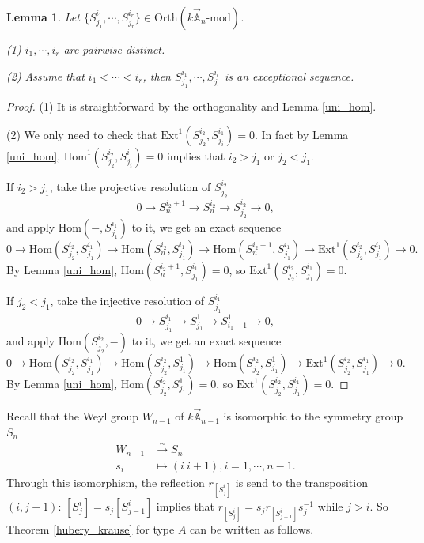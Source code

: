 \documentclass[a4paper, 11pt, reqno]{amsart}
\numberwithin{equation}{section}
\newtheorem{lem}[thm]{Lemma}
\theoremstyle{remark}
\theoremstyle{definition}
\begin{document}
\begin{lem}
   Let $\{S^{i_1}_{j_1}, \cdots, S^{i_r}_{j_r} \} \in \mathrm{Orth}(k \vec{\mathbb A}_{n} \text{-} \mathrm{mod})$.

   (1) $i_1, \cdots, i_r$ are pairwise distinct.

   (2) Assume that $i_1 < \cdots <i_r$, then $S^{i_1}_{j_1}, \cdots, S^{i_r}_{j_r}$ is an exceptional sequence.
\end{lem}
\begin{proof}
   (1) It is straightforward by the orthogonality and Lemma \ref{uni_hom}.

   (2) We only need to check that $\mathrm{Ext}^1(S^{i_2}_{j_2},S^{i_1}_{j_i})=0$. In fact by Lemma \ref{uni_hom}, $\mathrm{Hom}^1(S^{i_2}_{j_2},S^{i_1}_{j_i})=0$ implies that $i_2>j_1$ or $j_2<j_1$. 
   
   If $i_2>j_1$, take the projective resolution of $S^{i_2}_{j_2}$
   \[0 \to S^{i_2+1}_{n} \to S^{i_2}_n \to S^{i_2}_{j_2} \to 0,\]
   and apply $\mathrm{Hom}(-,S^{i_1}_{j_1})$ to it, we get an exact sequence
   \[0 \to \mathrm{Hom}(S^{i_2}_{j_2},S^{i_1}_{j_1}) \to \mathrm{Hom}(S^{i_2}_{n},S^{i_1}_{j_1}) \to \mathrm{Hom}(S^{i_2+1}_{n},S^{i_1}_{j_1}) \to \mathrm{Ext}^1(S^{i_2}_{j_2},S^{i_1}_{j_1}) \to 0.\]
   By Lemma \ref{uni_hom}, $\mathrm{Hom}(S^{i_2+1}_{n},S^{i_1}_{j_1})=0$, so $\mathrm{Ext}^1(S^{i_2}_{j_2},S^{i_1}_{j_1}) =0$.

   If $j_2<j_1$, take the injective resolution of $S^{i_1}_{j_1}$
   \[0 \to S^{i_1}_{j_1} \to S^{1}_{j_1} \to S^{1}_{i_1-1} \to 0,\]
   and apply $\mathrm{Hom}(S^{i_2}_{j_2},-)$ to it, we get an exact sequence
   \[0 \to \mathrm{Hom}(S^{i_2}_{j_2},S^{i_1}_{j_1}) \to \mathrm{Hom}(S^{i_2}_{j_2},S^{1}_{j_1}) \to \mathrm{Hom}(S^{i_2}_{j_2},S^{1}_{j_1}) \to \mathrm{Ext}^1(S^{i_2}_{j_2},S^{i_1}_{j_1}) \to 0. \]
   By Lemma \ref{uni_hom}, $\mathrm{Hom}(S^{i_2}_{j_2},S^{1}_{j_1})=0$, so $\mathrm{Ext}^1(S^{i_2}_{j_2},S^{i_1}_{j_1}) =0$.
\end{proof}

Recall that the Weyl group $W_{n-1}$ of $k \vec{\mathbb A}_{n-1}$ is isomorphic to the symmetry group $S_n$ 
\begin{align*}
   W_{n-1} &\xrightarrow{\sim} S_n \\
   s_i &\mapsto (i \ i+1), i=1,\cdots, n-1.
\end{align*}
Through this isomorphism, the reflection $r_{[S^i_j]}$ is send to the transposition $(i,j+1)$: $[S^i_j]=s_j [S^i_{j-1}]$ implies that $r_{[S^i_j]}=s_j r_{[S^i_{j-1}]} s_j^{-1}$ while $j>i$. So Theorem \ref{hubery_krause} for type $A$ can be written as follows. 
\end{document}

